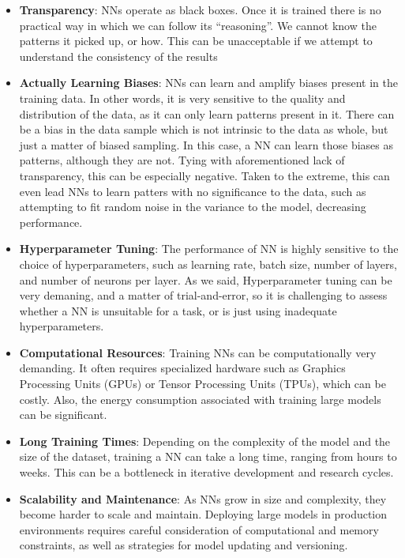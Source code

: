 \documentclass[a4paper, 11pt]{report}
\begin{document}
\begin{itemize}

\item \textbf{Transparency}: NNs operate as black boxes. Once it is trained there is no practical way in which we can follow its ``reasoning''. We cannot know the patterns it picked up, or how. This can be unacceptable if we attempt to understand the consistency of the results

\item \textbf{Actually Learning Biases}: NNs can learn and amplify biases present in the training data. In other words, it is very sensitive to the quality and distribution of the data, as it can only learn patterns present in it. There can be a bias in the data sample which is not intrinsic to the data as whole, but just a matter of biased sampling. In this case, a NN can learn those biases as patterns, although they are not. Tying with aforementioned lack of transparency, this can be especially negative. Taken to the extreme, this can even lead NNs to learn patters with no significance to the data, such as attempting to fit random noise in the variance to the model, decreasing performance.

\item \textbf{Hyperparameter Tuning}: The performance of NN is highly sensitive to the choice of hyperparameters, such as learning rate, batch size, number of layers, and number of neurons per layer. As we said, Hyperparameter tuning can be very demaning, and a matter of trial-and-error, so it is challenging to assess whether a NN is unsuitable for a task, or is just using inadequate hyperparameters.

\item \textbf{Computational Resources}: Training NNs can be computationally very demanding. It often requires specialized hardware such as Graphics Processing Units (GPUs) or Tensor Processing Units (TPUs), which can be costly. Also,  the energy consumption associated with training large models can be significant.

\item \textbf{Long Training Times}: Depending on the complexity of the model and the size of the dataset, training a NN can take a long time, ranging from hours to weeks. This can be a bottleneck in iterative development and research cycles.

\item \textbf{Scalability and Maintenance}: As NNs grow in size and complexity, they become harder to scale and maintain. Deploying large models in production environments requires careful consideration of computational and memory constraints, as well as strategies for model updating and versioning.


\end{itemize}
\end{document}
